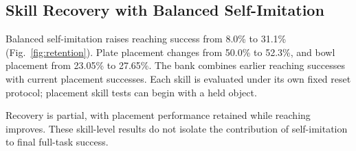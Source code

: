 \subsection{Skill Recovery with Balanced Self-Imitation}
Balanced self-imitation raises reaching success from 8.0\% to 31.1\% (Fig.~\ref{fig:retention}). Plate placement changes from 50.0\% to 52.3\%, and bowl placement from 23.05\% to 27.65\%. The bank combines earlier reaching successes with current placement successes. Each skill is evaluated under its own fixed reset protocol; placement skill tests can begin with a held object.


Recovery is partial, with placement performance retained while reaching improves. These skill-level results do not isolate the contribution of self-imitation to final full-task success.
